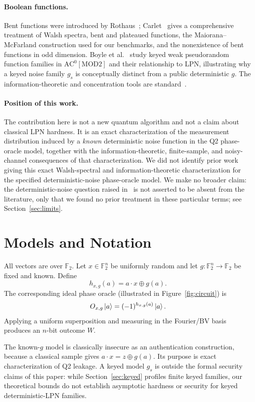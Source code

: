 \documentclass[10pt,twocolumn]{article}
\theoremstyle{definition}
\begin{document}
\paragraph{Boolean functions.} Bent functions were introduced by
Rothaus~\cite{rothaus1976}; Carlet~\cite{carlet2021} gives a comprehensive
treatment of Walsh spectra, bent and plateaued functions, the
Maiorana--McFarland construction used for our benchmarks, and the
nonexistence of bent functions in odd dimension. Boyle et al.~\cite{boyle2021}
study keyed weak pseudorandom function families in $\mathrm{AC}^0[\mathrm{MOD2}]$
and their relationship to LPN, illustrating why a keyed noise family
$g_s$ is conceptually distinct from a public deterministic $g$. The
information-theoretic and concentration tools are
standard~\cite{cover2006,hoeffding1963}.

\paragraph{Position of this work.} The contribution here is not a new quantum
algorithm and not a claim about classical LPN hardness. It is an exact
characterization of the measurement distribution induced by a \emph{known}
deterministic noise function in the Q2 phase-oracle model, together with the
information-theoretic, finite-sample, and noisy-channel consequences of that
characterization. We did not identify prior work giving this exact
Walsh-spectral and information-theoretic characterization for the specified
deterministic-noise phase-oracle model. We make no broader claim: the
deterministic-noise question raised in~\cite{cid2026} is not asserted to be
absent from the literature, only that we found no prior treatment in these
particular terms; see Section~\ref{sec:limits}.

\section{Models and Notation}

All vectors are over $\mathbb{F}_2$. Let $x \in \mathbb{F}_2^n$ be uniformly random and let $g : \mathbb{F}_2^n \to \mathbb{F}_2$ be fixed and known. Define
\[ h_{x,g}(a) = a \cdot x \oplus g(a). \]
The corresponding ideal phase oracle (illustrated in Figure~\ref{fig:circuit}) is
\[ O_{x,g}\ket{a} = (-1)^{h_{x,g}(a)}\ket{a}. \]
Applying a uniform superposition and measuring in the Fourier/BV basis produces an $n$-bit outcome $W$.

The known-$g$ model is classically insecure as an authentication construction, because a classical sample gives $a \cdot x = z \oplus g(a)$. Its purpose is exact characterization of Q2 leakage. A keyed model $g_s$ is outside the formal security claims of this paper: while Section~\ref{sec:keyed} profiles finite keyed families, our theoretical bounds do not establish asymptotic hardness or security for keyed deterministic-LPN families.
\end{document}
